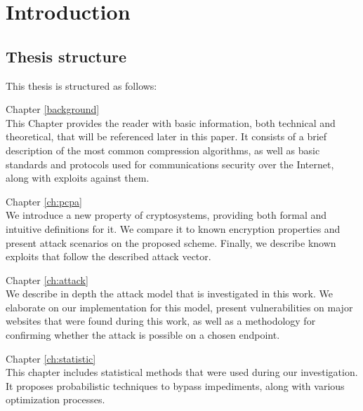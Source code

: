 \chapter{Introduction}\label{ch:intro}

\section{Thesis structure}\label{sec:structure}

This thesis is structured as follows:

\begin{description} \item{Chapter \ref{background}} \hfill \\

This Chapter provides the reader with basic information, both technical and
theoretical, that will be referenced later in this paper. It consists of a brief
description of the most common compression algorithms, as well as basic
standards and protocols used for communications security over the Internet,
along with exploits against them. \hfill \\

\item{Chapter \ref{ch:pcpa}} \hfill \\

We introduce a new property of cryptosystems, providing both formal and
intuitive definitions for it. We compare it to known encryption properties and
present attack scenarios on the proposed scheme. Finally, we describe known
exploits that follow the described attack vector. \hfill \\

\item{Chapter \ref{ch:attack}} \hfill \\

We describe in depth the attack model that is investigated in this work. We
elaborate on our implementation for this model, present vulnerabilities on major
websites that were found during this work, as well as a methodology for
confirming whether the attack is possible on a chosen endpoint. \hfill \\

\item{Chapter \ref{ch:statistic}} \hfill \\

This chapter includes statistical methods that were used during our
investigation. It proposes probabilistic techniques to bypass impediments, along
with various optimization processes. \hfill \\


\end{description}
